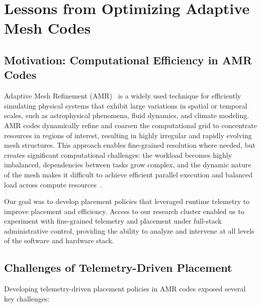 \chapter{Lessons from Optimizing Adaptive Mesh Codes}
\label{chap:amr}

\section{Motivation: Computational Efficiency in AMR Codes}

Adaptive Mesh Refinement (AMR)~\cite{Dubey2014:Survey,Grete2023:Parthenon,Zhang2021:AMReX} is a
widely used technique for efficiently simulating physical systems that exhibit large variations in
spatial or temporal scales, such as astrophysical phenomena, fluid dynamics, and climate modeling.
AMR codes dynamically refine and coarsen the computational grid to concentrate resources in regions
of interest, resulting in highly irregular and rapidly evolving mesh structures.
This approach enables fine-grained resolution where needed, but creates significant computational
challenges: the workload becomes highly imbalanced, dependencies between tasks grow complex, and
the dynamic nature of the mesh makes it difficult to achieve efficient parallel execution and
balanced load across compute
resources~\cite{Klenk2017:OverviewMPICharacteristics,Dubey2014:Survey,Burst2008:ALPS}.

Our goal was to develop placement policies that leveraged runtime telemetry to improve placement
and efficiency.
Access to our research cluster enabled us to experiment with fine-grained telemetry and placement
under full-stack administrative control, providing the ability to analyze and intervene at all
levels of the software and hardware stack.

\section{Challenges of Telemetry-Driven Placement}

Developing telemetry-driven placement policies in AMR codes exposed several
key challenges:


